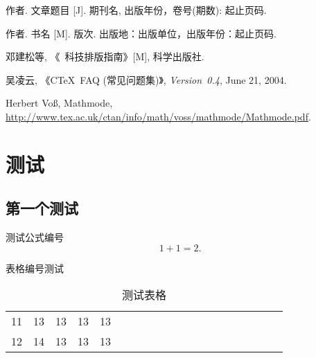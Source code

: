 \documentclass[forprint]{HedaBachelor}
\begin{document}
\cleardoublepage{}
{}
\begin{thebibliography}{00}

   作者. 文章题目 [J].  期刊名, 出版年份，卷号(期数): 起止页码.

   作者. 书名 [M]. 版次. 出版地：出版单位，出版年份：起止页码.

   邓建松等, 《\LaTeXe~科技排版指南》[M], 科学出版社.

   吴凌云, 《CTeX~FAQ (常见问题集)》, \textit{Version~0.4}, June 21, 2004.

   Herbert Vo\ss, Mathmode, \url{http://www.tex.ac.uk/ctan/info/math/voss/mathmode/Mathmode.pdf}.


\end{thebibliography}


\appendix

\chapter{测试}

\section{第一个测试}
测试公式编号
\begin{equation}
1+1=2.
\end{equation}

表格编号测试

\begin{table}[h] 
  \centering
  \caption{测试表格}
  \begin{tabular}{*{20}c}
     \hline
     11 & 13  & 13  & 13  & 13 \\
     12 & 14  & 13  & 13  & 13 \\
     \hline
   \end{tabular}
\end{table}


%
%
%



\cleardoublepage   %
\end{document}
